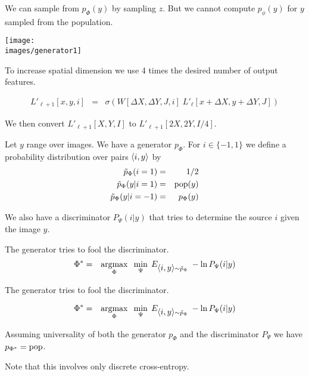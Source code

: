 {\bigskip
We can sample from $p_\Phi(y)$ by sampling $z$.  But we cannot compute $p_\phi(y)$ for $y$ sampled from the population.


\centerline{\texttt{[image: \\images/generator1]}}

\vfill
To increase spatial dimension we use 4 times the desired number of output features.

\begin{eqnarray*}
  L'_{\ell+1}[x,y,i] & = & \sigma\left(W[\Delta X, \Delta Y, J,i]\; L'_\ell[x + \Delta X, y + \Delta Y, J]\right)
\end{eqnarray*}

\vfill
We then convert $L'_{\ell+1}[X,Y,I]$ to $L'_{\ell+1}[2X,2Y,I/4]$.


Let $y$ range over images.  We have a generator $p_\Phi$. For $i \in \{-1,1\}$ we define a probability distribution over pairs
${\mbox{$\langle i,y\rangle$}}$ by
\begin{eqnarray*}
\tilde{p}_\Phi(i = 1) & = & 1/2 \\
\tilde{p}_\Phi(y|i=1) & =&  \mathrm{pop}(y) \\
\tilde{p}_\Phi(y|i=-1) & = & p_\Phi(y)
\end{eqnarray*}

\vfill
We also have a discriminator $P_\Psi(i|y)$ that tries to determine the source $i$ given the image $y$.

\vfill
The generator tries to fool the discriminator.
\begin{eqnarray*}
\Phi^* & = & \operatorname*{argmax}_\Phi\;\;\min_\Psi\;E_{{\mbox{$\langle i,y\rangle$}} \sim \tilde{p}_\Phi}\;-\ln P_\Psi(i|y)
\end{eqnarray*}


The generator tries to fool the discriminator.

\vfill
\begin{eqnarray*}
\Phi^* & = & \operatorname*{argmax}_\Phi\;\;\min_\Psi\;E_{{\mbox{$\langle i,y\rangle$}} \sim \tilde{p}_\Phi}\;-\ln P_\Psi(i|y)
\end{eqnarray*}

\vfill
Assuming universality of both the generator $p_\Phi$ and the discriminator $P_\Psi$ we have {\color{red} $p_{\Phi^*} = \mathrm{pop}$}.

\vfill
Note that this involves only discrete cross-entropy.

}
